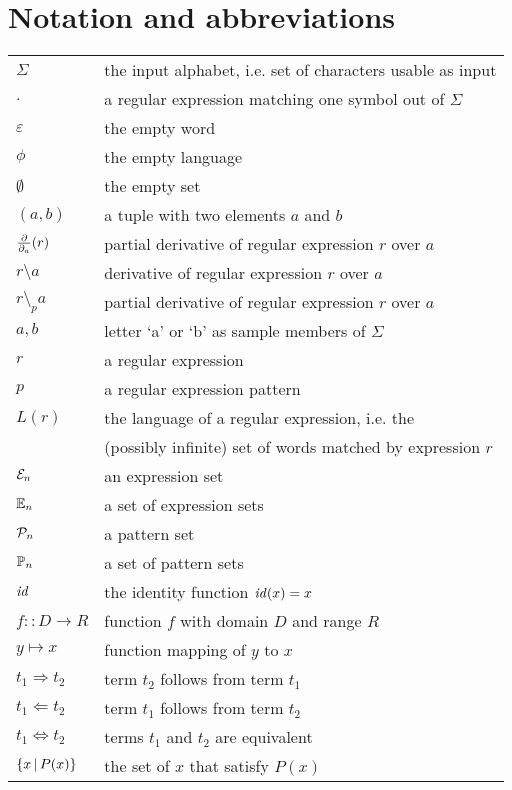 \chapter*{Notation and abbreviations}


\begin{tabular}{ll}
   $\Sigma$ & the input alphabet, i.e. set of characters usable as input \\
   $.$ & a regular expression matching one symbol out of $\Sigma$ \\
   $\varepsilon$ & the empty word \\
   $\phi$ & the empty language \\
   $\emptyset$ & the empty set \\
   $(a,b)$ & a tuple with two elements $a$ and $b$ \\
   $\frac{\partial}{\partial_{a}}(r)$ & partial derivative of regular expression $r$ over $a$ \\
   $r \setminus a$ & derivative of regular expression $r$ over $a$ \\
   $r \setminus_p a$ & partial derivative of regular expression $r$ over $a$ \\
   $a, b$ & letter `a' or `b' as sample members of $\Sigma$ \\
   $r$ & a regular expression \\
   $p$ & a regular expression pattern \\
   $L(r)$ & the language of a regular expression, i.e. the \\
          & (possibly infinite) set of words matched by expression $r$ \\
   $\mathcal{E}_n$ & an expression set \\
   $\mathbb{E}_n$ & a set of expression sets \\
   $\mathcal{P}_n$ & a pattern set \\
   $\mathbb{P}_n$ & a set of pattern sets \\
   $\mathit{id}$ & the identity function $\mathit{id}(x) = x$ \\
   $f :: D \to R$ & function $f$ with domain $D$ and range $R$ \\
   $y \mapsto x$ & function mapping of $y$ to $x$ \\
   $t_1 \Rightarrow t_2$ & term $t_2$ follows from term $t_1$ \\
   $t_1 \Leftarrow t_2$ & term $t_1$ follows from term $t_2$ \\
   $t_1 \Leftrightarrow t_2$ & terms $t_1$ and $t_2$ are equivalent \\
   $\{ x \operatorname{|} P(x) \}$ & the set of $x$ that satisfy $P(x)$ \\
\end{tabular}


